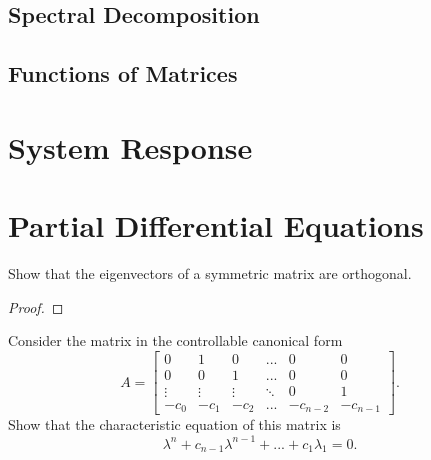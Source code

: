 \documentclass[conference,12pt,onecolumn,compsoc]{IEEEtran}
\begin{document}
\subsection{Spectral Decomposition}
\label{section: Spectral Decomposition}

\subsection{Functions of Matrices}
\label{section: Functions of Matrices}


\section{System Response}
\label{section: System Response}

 
\section{Partial Differential Equations}
\label{section: Partial Differential Equations} 
 
\begin{exercise}
Show that the eigenvectors of a symmetric matrix are orthogonal. 
\end{exercise}
\begin{proof}

\end{proof}

\begin{exercise}
Consider the matrix in the controllable canonical form
\begin{equation}
A=\begin{bmatrix} 0 & 1 & 0 & ... & 0 & 0 \\ 
0 & 0 & 1 & ... & 0 & 0 \\
\vdots & \vdots & \vdots & \ddots & 0 & 1 \\
-c_0 & -c_1 & -c_2 & ... & -c_{n-2} & -c_{n-1}  \end{bmatrix}.
\nonumber
\end{equation}
Show that the characteristic equation of this matrix is
\begin{equation}
\lambda^n+c_{n-1}\lambda^{n-1}+...+c_1\lambda_1=0.
\nonumber
\end{equation}
\end{exercise}
\end{document}
